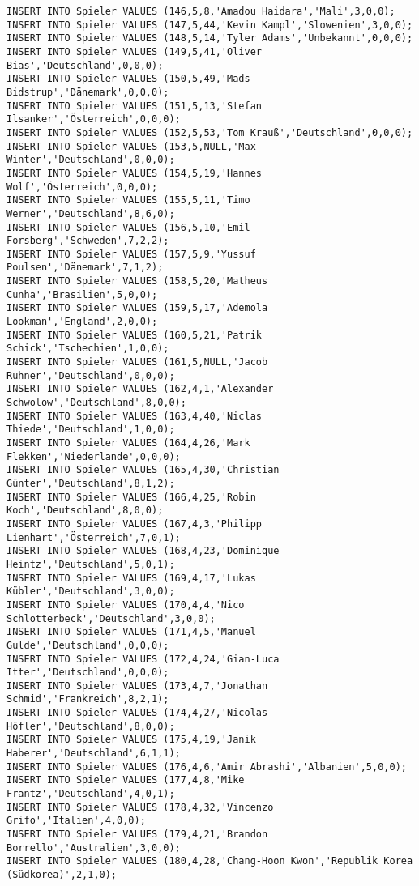 \documentclass{lehramt-informatik-aufgabe}
\begin{document}
\begin{verbatim}
INSERT INTO Spieler VALUES (146,5,8,'Amadou Haidara','Mali',3,0,0);
INSERT INTO Spieler VALUES (147,5,44,'Kevin Kampl','Slowenien',3,0,0);
INSERT INTO Spieler VALUES (148,5,14,'Tyler Adams','Unbekannt',0,0,0);
INSERT INTO Spieler VALUES (149,5,41,'Oliver Bias','Deutschland',0,0,0);
INSERT INTO Spieler VALUES (150,5,49,'Mads Bidstrup','Dänemark',0,0,0);
INSERT INTO Spieler VALUES (151,5,13,'Stefan Ilsanker','Österreich',0,0,0);
INSERT INTO Spieler VALUES (152,5,53,'Tom Krauß','Deutschland',0,0,0);
INSERT INTO Spieler VALUES (153,5,NULL,'Max Winter','Deutschland',0,0,0);
INSERT INTO Spieler VALUES (154,5,19,'Hannes Wolf','Österreich',0,0,0);
INSERT INTO Spieler VALUES (155,5,11,'Timo Werner','Deutschland',8,6,0);
INSERT INTO Spieler VALUES (156,5,10,'Emil Forsberg','Schweden',7,2,2);
INSERT INTO Spieler VALUES (157,5,9,'Yussuf Poulsen','Dänemark',7,1,2);
INSERT INTO Spieler VALUES (158,5,20,'Matheus Cunha','Brasilien',5,0,0);
INSERT INTO Spieler VALUES (159,5,17,'Ademola Lookman','England',2,0,0);
INSERT INTO Spieler VALUES (160,5,21,'Patrik Schick','Tschechien',1,0,0);
INSERT INTO Spieler VALUES (161,5,NULL,'Jacob Ruhner','Deutschland',0,0,0);
INSERT INTO Spieler VALUES (162,4,1,'Alexander Schwolow','Deutschland',8,0,0);
INSERT INTO Spieler VALUES (163,4,40,'Niclas Thiede','Deutschland',1,0,0);
INSERT INTO Spieler VALUES (164,4,26,'Mark Flekken','Niederlande',0,0,0);
INSERT INTO Spieler VALUES (165,4,30,'Christian Günter','Deutschland',8,1,2);
INSERT INTO Spieler VALUES (166,4,25,'Robin Koch','Deutschland',8,0,0);
INSERT INTO Spieler VALUES (167,4,3,'Philipp Lienhart','Österreich',7,0,1);
INSERT INTO Spieler VALUES (168,4,23,'Dominique Heintz','Deutschland',5,0,1);
INSERT INTO Spieler VALUES (169,4,17,'Lukas Kübler','Deutschland',3,0,0);
INSERT INTO Spieler VALUES (170,4,4,'Nico Schlotterbeck','Deutschland',3,0,0);
INSERT INTO Spieler VALUES (171,4,5,'Manuel Gulde','Deutschland',0,0,0);
INSERT INTO Spieler VALUES (172,4,24,'Gian-Luca Itter','Deutschland',0,0,0);
INSERT INTO Spieler VALUES (173,4,7,'Jonathan Schmid','Frankreich',8,2,1);
INSERT INTO Spieler VALUES (174,4,27,'Nicolas Höfler','Deutschland',8,0,0);
INSERT INTO Spieler VALUES (175,4,19,'Janik Haberer','Deutschland',6,1,1);
INSERT INTO Spieler VALUES (176,4,6,'Amir Abrashi','Albanien',5,0,0);
INSERT INTO Spieler VALUES (177,4,8,'Mike Frantz','Deutschland',4,0,1);
INSERT INTO Spieler VALUES (178,4,32,'Vincenzo Grifo','Italien',4,0,0);
INSERT INTO Spieler VALUES (179,4,21,'Brandon Borrello','Australien',3,0,0);
INSERT INTO Spieler VALUES (180,4,28,'Chang-Hoon Kwon','Republik Korea (Südkorea)',2,1,0);

\end{verbatim}
\end{document}
